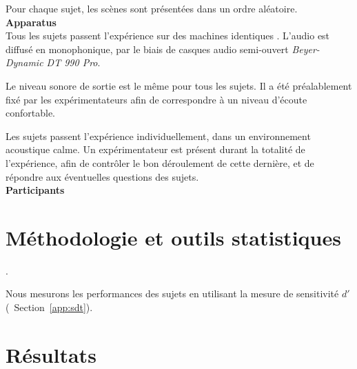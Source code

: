 Pour chaque sujet, les scènes sont présentées dans un ordre aléatoire.  \\

\textbf{Apparatus} \\

Tous les sujets passent l'expérience sur des machines identiques . L'audio est diffusé en monophonique, par le biais de casques audio semi-ouvert \emph{Beyer-Dynamic DT 990 Pro}. 

Le niveau sonore de sortie est le même pour tous les sujets. Il a été préalablement fixé par les expérimentateurs afin de correspondre à un niveau d'écoute confortable.

Les sujets passent l'expérience individuellement, dans un environnement acoustique calme. Un expérimentateur est présent durant la totalité de l'expérience, afin de contrôler le bon déroulement de cette dernière, et de répondre aux éventuelles questions des sujets. \\

\textbf{Participants} \\


\section{Méthodologie et outils statistiques}

.

Nous mesurons les performances des sujets en utilisant la mesure de sensitivité $d'$ (\cf~Section~\ref{app:sdt}).
 
\section{Résultats}

